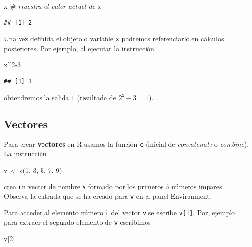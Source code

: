 \documentclass[
  degree=mecinf,
  title=normal,
  toc=normal,
  bib=normal]{mnye}
\newenvironment{Shaded}{\begin{snugshade}}{\end{snugshade}}
\newcommand{\CommentTok}[1]{\textcolor[rgb]{0.56,0.35,0.01}{\textit{#1}}}
\newcommand{\DecValTok}[1]{\textcolor[rgb]{0.00,0.00,0.81}{#1}}
\newcommand{\FunctionTok}[1]{\textcolor[rgb]{0.00,0.00,0.00}{#1}}
\newcommand{\NormalTok}[1]{#1}
\newcommand{\OtherTok}[1]{\textcolor[rgb]{0.56,0.35,0.01}{#1}}
\newcommand{\SpecialCharTok}[1]{\textcolor[rgb]{0.00,0.00,0.00}{#1}}
\begin{document}
\begin{Shaded}
\begin{Highlighting}[]
\NormalTok{x }\CommentTok{\# muestra el valor actual de x}
\end{Highlighting}
\end{Shaded}

\begin{verbatim}
## [1] 2
\end{verbatim}

Una vez definida el objeto o variable \texttt{x} podremos referenciarlo en cálculos posteriores. Por ejemplo, al ejecutar la instrucción

\begin{Shaded}
\begin{Highlighting}[]
\NormalTok{x}\SpecialCharTok{\^{}}\DecValTok{2{-}3}
\end{Highlighting}
\end{Shaded}

\begin{verbatim}
## [1] 1
\end{verbatim}

obtendremos la salida \(1\) (resultado de \(2^2-3 = 1\)).

\hypertarget{vectores}{%
\subsection{Vectores}\label{vectores}}

Para crear \textbf{vectores} en \textsf{R} usamos la función \texttt{c} (inicial de \emph{concatenate} o \emph{combine}). La instrucción

\begin{Shaded}
\begin{Highlighting}[]
\NormalTok{v }\OtherTok{\textless{}{-}} \FunctionTok{c}\NormalTok{(}\DecValTok{1}\NormalTok{, }\DecValTok{3}\NormalTok{, }\DecValTok{5}\NormalTok{, }\DecValTok{7}\NormalTok{, }\DecValTok{9}\NormalTok{)}
\end{Highlighting}
\end{Shaded}

crea un vector de nombre \texttt{v} formado por los primeros \(5\) números impares. Observa la entrada que se ha creado para \texttt{v} en el panel Environment.

Para acceder al elemento número \texttt{i} del vector \texttt{v} se escribe \texttt{v{[}i{]}}. Por, ejemplo para extraer el segundo elemento de \texttt{v} escribimos

\begin{Shaded}
\begin{Highlighting}[]
\NormalTok{v[}\DecValTok{2}\NormalTok{]}
\end{Highlighting}
\end{Shaded}
\end{document}
